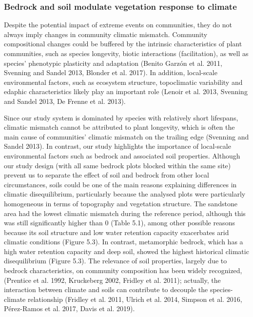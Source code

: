 \documentclass[11pt,twoside]{reedthesis}
\begin{document}
\subsubsection{Bedrock and soil modulate vegetation response to
climate}\label{bedrock-and-soil-modulate-vegetation-response-to-climate}

Despite the potential impact of extreme events on communities, they do
not always imply changes in community climatic mismatch. Community
compositional changes could be buffered by the intrinsic characteristics
of plant communities, such as species longevity, biotic interactions
(facilitation), as well as species' phenotypic plasticity and adaptation
(Benito Garzón et al. 2011, Svenning and Sandel 2013, Blonder et al.
2017). In addition, local-scale environmental factors, such as ecosystem
structure, topoclimatic variability and edaphic characteristics likely
play an important role (Lenoir et al. 2013, Svenning and Sandel 2013, De
Frenne et al. 2013).\par

Since our study system is dominated by species with relatively short
lifespans, climatic mismatch cannot be attributed to plant longevity,
which is often the main cause of communities' climatic mismatch on the
trailing edge (Svenning and Sandel 2013). In contrast, our study
highlights the importance of local-scale environmental factors such as
bedrock and associated soil properties. Although our study design (with
all same bedrock plots blocked within the same site) prevent us to
separate the effect of soil and bedrock from other local circumstances,
soils could be one of the main reasons explaining differences in
climatic disequilibrium, particularly because the analysed plots were
particularly homogeneous in terms of topography and vegetation
structure. The sandstone area had the lowest climatic mismatch during
the reference period, although this was still significantly higher than
0 (Table 5.1), among other possible reasons because its soil structure
and low water retention capacity exacerbates arid climatic conditions
(Figure 5.3). In contrast, metamorphic bedrock, which has a high water
retention capacity and deep soil, showed the highest historical climatic
disequilibrium (Figure 5.3). The relevance of soil properties, largely
due to bedrock characteristics, on community composition has been widely
recognized, (Prentice et al. 1992, Kruckeberg 2002, Fridley et al.
2011); actually, the interaction between climate and soils can
contribute to decouple the species-climate relationship (Fridley et al.
2011, Ulrich et al. 2014, Simpson et al. 2016, Pérez-Ramos et al. 2017,
Davis et al. 2019).\par
\end{document}
